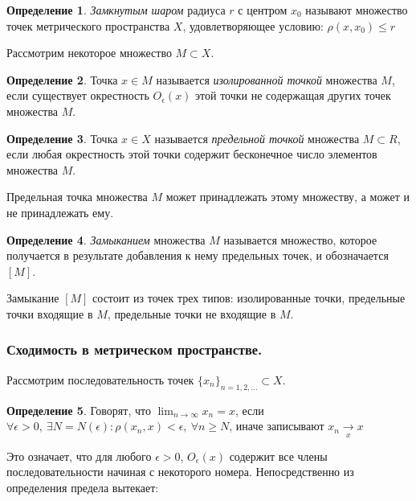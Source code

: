 \documentclass[14pt,a4paper]{extarticle}
\theoremstyle{definition}
\newtheorem{definition}{Определение}[section]
\theoremstyle{remark}
\renewcommand{\[}{\begin{dmath*}[compact]}
\renewcommand{\]}{\end{dmath*}}
\newcommand{\ds}{\displaystyle}
\newcommand{\sep}{ , \ \allowbreak }
\begin{document}
\begin{definition}
  \textit{Замкнутым шаром} радиуса $r$ с центром $x_0$ называют множество точек
  метрического пространства $X$,
  удовлетворяющее условию: $\rho(x, x_0) \leq r$
\end{definition}

Рассмотрим некоторое множество $M \subset X$.

\begin{definition}
  Точка $x \in M$ называется \textit{изолированной точкой} множества $M$,
  если существует окрестность $O_\epsilon(x)$
  этой точки не содержащая других точек множества $M$.
\end{definition}

\begin{definition}
  Точка $x \in X$ называется \textit{предельной точкой} множества $M \subset R$,
  если любая окрестность этой точки содержит бесконечное число
  элементов множества $M$.
\end{definition}

Предельная точка множества $M$ может принадлежать этому множеству, а может
и не принадлежать ему.

\begin{definition}
  \textit{Замыканием} множества $M$ называется множество,
  которое получается в результате добавления к нему предельных точек,
  и обозначается $[M]$.
\end{definition}

Замыкание $[M]$ состоит из точек трех типов: изолированные точки, предельные
точки входящие в $M$, предельные точки не входящие в $M$.

\subsubsection{Сходимость в метрическом пространстве.}

Рассмотрим последовательность точек $\{x_n\}_{n=1,2,\dots}\subset X$.

\begin{definition}
  Говорят, что $\ds\lim_{n \to \infty} x_n = x$, если
  $\forall \epsilon > 0 \sep \exists N = N(\epsilon): \rho(x_n, x)<\epsilon \sep
  \forall n \geq N$, иначе записывают $x_n \underset{x}{\to} x$
\end{definition}

Это означает, что для любого $\epsilon > 0$, $O_\epsilon(x)$ содержит все
члены последовательности начиная с некоторого номера. Непосредственно из
определения предела вытекает:
\end{document}

